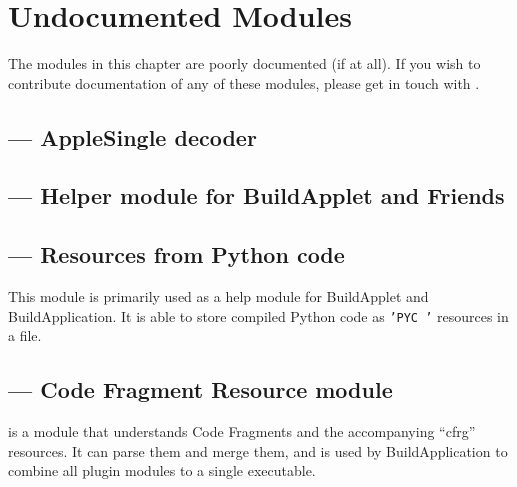 \chapter{Undocumented Modules \label{undocumented-modules}}


The modules in this chapter are poorly documented (if at all).  If you
wish to contribute documentation of any of these modules, please get in
touch with
.

\localmoduletable


\section{ --- AppleSingle decoder}


\section{ --- Helper module for BuildApplet and Friends}


\section{ --- Resources from Python code}

This module is primarily used as a help module for BuildApplet and
BuildApplication.  It is able to store compiled Python code as
\texttt{'PYC '} resources in a file.


\section{ --- Code Fragment Resource module}

 is a module that understands Code Fragments and the
accompanying ``cfrg'' resources. It can parse them and merge them, and is
used by BuildApplication to combine all plugin modules to a single
executable.


